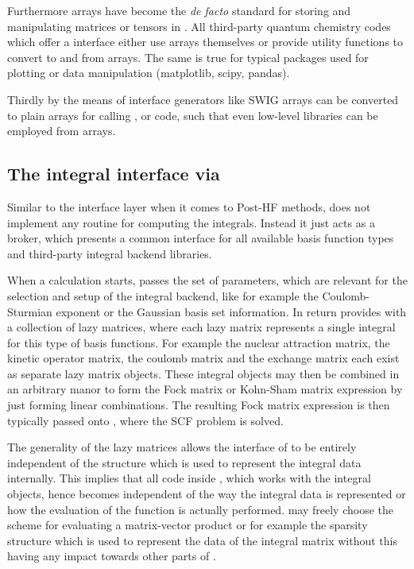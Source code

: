 Furthermore \numpy arrays have become the \textit{de facto} standard
for storing and manipulating matrices or tensors in \python.
All third-party quantum chemistry codes which
offer a \python interface
either use \numpy arrays themselves or
provide utility functions to convert to and
from \numpy arrays.
The same is true for typical \python packages used for plotting or
data manipulation (matplotlib, scipy, pandas).

Thirdly by the means of interface generators
like SWIG  \numpy arrays can be converted to plain
\cee arrays for calling \cpp, \cee or \fortran code,
such that even low-level libraries can be employed
from \numpy arrays.

%
%
\subsection{The integral interface via \gint}
Similar to the \molsturm interface layer when it comes to Post-HF methods,
\gint does not implement any routine for computing the integrals.
Instead it just acts as a broker,
which presents a common interface for all available basis function types
and third-party integral backend libraries.

When a calculation starts,
\molsturm passes \gint the set of parameters,
which are relevant for the selection and setup of the integral backend,
like for example the Coulomb-Sturmian exponent or the Gaussian basis set information.
In return \gint provides \molsturm with a collection of lazy matrices,
where each lazy matrix represents a single integral for this
type of basis functions.
For example the nuclear attraction matrix, the kinetic operator matrix,
the coulomb matrix and the exchange matrix each exist as separate
lazy matrix objects.
These integral objects may then be combined
in an arbitrary manor to form the Fock matrix or Kohn-Sham matrix
expression by just forming linear combinations.
The resulting Fock matrix expression is then typically passed onto \gscf,
where the SCF problem is solved.

The generality of the lazy matrices allows the interface of \gint
to be entirely independent of the structure
which is used to represent the integral data internally.
This implies that all code inside \molsturm,
which works with the integral objects,
hence becomes independent of the way the integral data is represented
or how the evaluation of the \contraction function is actually performed.
\gint may freely choose the scheme for evaluating a matrix-vector
product or for example the sparsity structure which is used to
represent the data of the integral matrix
without this having any impact towards other parts of \molsturm.

